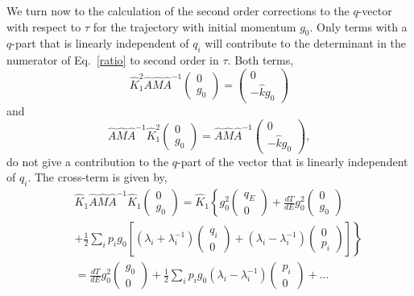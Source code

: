 \documentclass[journal=jpcafh,manuscript=article]{achemso}
\begin{document}
We turn now to the calculation of the second order corrections to the
$q$-vector with respect to $\tau$ for the trajectory with initial
momentum $g_0$.  Only terms with a $q$-part that is linearly
independent of $q_i$ will contribute to the determinant in the
numerator of Eq.~\ref{ratio} to second order in $\tau$.  Both terms,
\begin{equation}
  \label{b20}
  \hat{K}_1^2\hat{A}\hat{M}\hat{A}^{-1}\left(\begin{array}{c}0\\g_0\end{array}\right)=
  \left(\begin{array}{c}0\\-\hat{k}g_0\end{array}\right)
\end{equation}
and
\begin{equation}
  \label{b25}
  \hat{A}\hat{M}\hat{A}^{-1}\hat{K}_1^2\left(\begin{array}{c}0\\g_0\end{array}\right)
 = \hat{A}\hat{M}\hat{A}^{-1} \left(\begin{array}{c}0\\-\hat{k}g_0\end{array}\right),                                                
\end{equation}
do not give a contribution to the $q$-part of the vector that is linearly independent of $q_i$.
The cross-term is given by,
\begin{eqnarray}
  \nonumber
  &&\hat{K}_1\hat{A}\hat{M}\hat{A}^{-1}\hat{K}_1\left(\begin{array}{c}0\\g_0\end{array}\right)=\hat{K}_1\left\{
  g_0^2\left(\begin{array}{c}q_E\\0\end{array}\right)+\frac{dT}{dE}g_0^2\left(\begin{array}{c}0\\g_0\end{array}\right)\right.
  \\
  \nonumber
  &&+\left.\frac{1}{2}\sum_i p_ig_0\left[(\lambda_i+\lambda_i^{-1})\left(\begin{array}{c}q_i\\0\end{array}\right)
  +(\lambda_i-\lambda_i^{-1})\left(\begin{array}{c}0\\p_i\end{array}\right)\right]\right\}
  \\
  \label{b22}
  &&=\frac{dT}{dE}g_0^2\left(\begin{array}{c}g_0\\0\end{array}\right)
  +\frac{1}{2}\sum_i p_ig_0 (\lambda_i-\lambda_i^{-1})\left(\begin{array}{c}p_i\\0\end{array}\right)
  + ...
\end{eqnarray}
\end{document}
